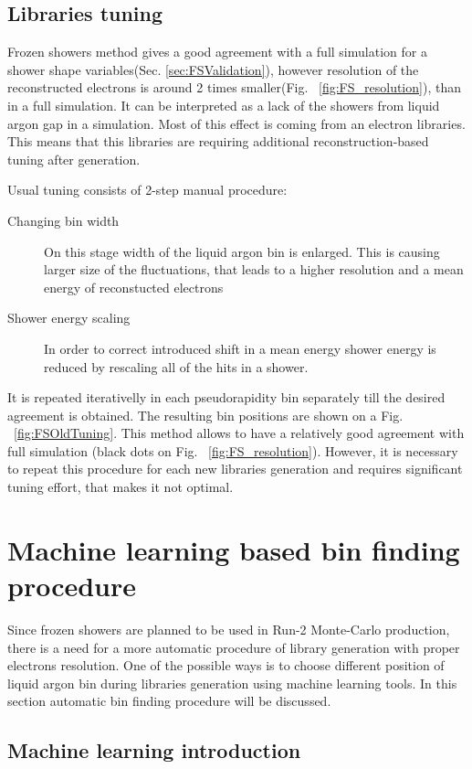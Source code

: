\subsection{Libraries tuning}

Frozen showers method gives a good agreement with a full simulation for a shower shape variables(Sec. \ref{sec:FSValidation}), however resolution of the reconstructed electrons is around 2 times smaller(Fig. ~\ref{fig:FS_resolution}), than in a full simulation. It can be interpreted as a lack of the showers from liquid argon gap in a simulation. Most of this effect is coming from an electron libraries. This means that this libraries are requiring additional reconstruction-based tuning after generation.

Usual tuning consists of 2-step manual procedure:
\begin{description}
\item [Changing bin width] On this stage width of the liquid argon bin is enlarged. This is causing larger size of the fluctuations, that leads to a higher resolution and a mean energy of reconstucted electrons
\item [Shower energy scaling] In order to correct introduced shift in a mean energy shower energy is reduced by rescaling all of the hits in a shower.
\end{description}
 It is repeated iterativelly in each pseudorapidity bin separately till the desired agreement is obtained. The resulting bin positions are shown on a Fig.  ~\ref{fig:FSOldTuning}. This method allows to have a relatively good agreement with full simulation (black dots on Fig. ~\ref{fig:FS_resolution}). However, it is necessary to repeat this procedure for each new libraries generation and requires significant tuning effort, that makes it not optimal. 

\section{Machine learning based bin finding procedure}

Since frozen showers are planned to be used in Run-2 Monte-Carlo production, there is a need for a more automatic procedure of library generation with proper electrons resolution. One of the possible ways is to choose different position of liquid argon bin during libraries generation using machine learning tools. In this section automatic bin finding procedure will be discussed.
\subsection{Machine learning introduction} 

